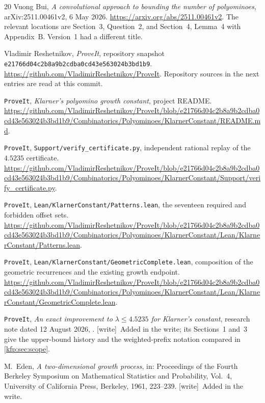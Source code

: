 \documentclass[11pt,a4paper]{article}
\theoremstyle{definition}
\theoremstyle{remark}
\newcommand{\repo}{\texttt{ProveIt}}
\newcommand{\sha}{\texttt{e21766d04c2b8a9b2cdba0cd43e563024b3bd1b9}}
\newcommand{\wtag}{\textsf{\small[write]}}
\begin{document}
\clearpage
\begin{thebibliography}{20}
\small
{}
Vuong Bui, \emph{A convolutional approach to bounding the number of
polyominoes}, arXiv:2511.00461v2, 6 May 2026.
\url{https://arxiv.org/abs/2511.00461v2}.
The relevant locations are Section~3, Question~2, and Section~4,
Lemma~4 with Appendix~B. Version~1 had a different title.

Vladimir Reshetnikov, \emph{ProveIt}, repository snapshot
\sha.
\url{https://github.com/VladimirReshetnikov/ProveIt}.
Repository sources in the next entries are read at this commit.

\repo, \emph{Klarner's polyomino growth constant}, project README.
\url{https://github.com/VladimirReshetnikov/ProveIt/blob/e21766d04c2b8a9b2cdba0cd43e563024b3bd1b9/Combinatorics/Polyominoes/KlarnerConstant/README.md}.

\repo, \texttt{Support/verify\_certificate.py}, independent rational replay
of the $4.5235$ certificate.
\url{https://github.com/VladimirReshetnikov/ProveIt/blob/e21766d04c2b8a9b2cdba0cd43e563024b3bd1b9/Combinatorics/Polyominoes/KlarnerConstant/Support/verify_certificate.py}.

\repo, \texttt{Lean/KlarnerConstant/Patterns.lean}, the seventeen required
and forbidden offset sets.
\url{https://github.com/VladimirReshetnikov/ProveIt/blob/e21766d04c2b8a9b2cdba0cd43e563024b3bd1b9/Combinatorics/Polyominoes/KlarnerConstant/Lean/KlarnerConstant/Patterns.lean}.

\repo, \texttt{Lean/KlarnerConstant/GeometricComplete.lean}, composition of
the geometric recurrences and the existing growth endpoint.
\url{https://github.com/VladimirReshetnikov/ProveIt/blob/e21766d04c2b8a9b2cdba0cd43e563024b3bd1b9/Combinatorics/Polyominoes/KlarnerConstant/Lean/KlarnerConstant/GeometricComplete.lean}.

\repo, \emph{An exact improvement to $\lambda\leq4.5235$ for Klarner's
constant}, research note dated 12 August 2026,
.
\wtag\ Added in the write; its Sections~1 and~3 give the upper-bound history
and the weighted-prefix notation compared in \cref{kfp:sec:scope}.

M.~Eden, \emph{A two-dimensional growth process}, in: Proceedings of the
Fourth Berkeley Symposium on Mathematical Statistics and Probability,
Vol.~4, University of California Press, Berkeley, 1961, 223--239.
\wtag\ Added in the write.


\end{thebibliography}
\end{document}
